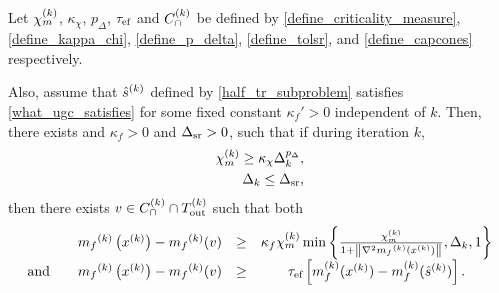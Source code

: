 % 

\begin{theorem}

\label{sufficient_reduction_theorem}
Let 
${\chi_m^{(k)}}$,
$\kappa_{\chi}$,
$p_{\Delta}$,
${\tau_{\textrm{ef}}}$
and ${C^{(k)}_{\cap}}$
be defined by
\cref{define_criticality_measure},
\cref{define_kappa_chi},
\cref{define_p_delta},
\cref{define_tolsr},
and \cref{define_capcones}
respectively.



Also, assume that ${{\hat s}^{(k)}}$ defined by \cref{half_tr_subproblem} satisfies \cref{what_ugc_satisfies} for some fixed constant $\kappa_f'>0$ independent of $k$.
Then, there exists and $\kappa_f>0$ and ${\Delta_{\textrm{sr}}}>0$, such that if during iteration $k$,
\begin{align}
{\chi_m^{(k)}} \ge \kappa_{\chi} \Delta_k^{p_{\Delta}}, \label{sr_chi_big_enough} \\
\Delta_k \le {\Delta_{\textrm{sr}}}, \label{sr_delta_small_enough}
\end{align}
then there exists $v \in {C^{(k)}_{\cap}} \cap {T_{\text{out}}^{(k)}}$ such that both
\begin{align*}
\begin{array}{cccc}
& {{m}_f}^{(k)}\left(x^{(k)}\right) - {{m}_f}^{(k)}(v) & \ge & \kappa_f {\chi_m^{(k)}} \min\left\{ \frac{{\chi_m^{(k)}}}{1+\left\|\nabla^2 {{m}_f}^{(k)}(x^{(k)})\right\|}, \Delta_k, 1 \right\} \\
\textrm{and} \quad & {{m}_f}^{(k)}\left(x^{(k)}\right) - {{m}_f}^{(k)}(v) &\ge& {\tau_{\textrm{ef}}}\left[m_f^{(k)}(x^{(k)}) - m_f^{(k)}({{\hat s}^{(k)}})\right].
\end{array}
\end{align*}

\end{theorem}

